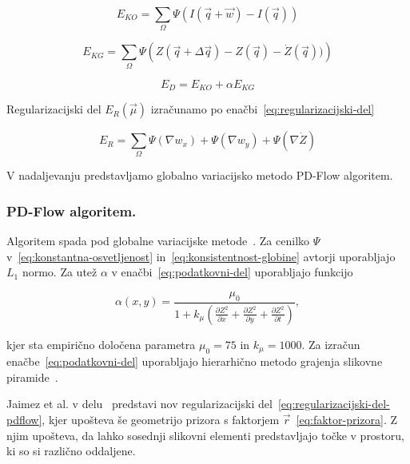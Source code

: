 \begin{equation}\label{eq:konstantna-osvetljenost}
	E_{KO} = \sum_\Omega \Psi( I(\vec{q} + \vec{w}) - I(\vec{q}))
\end{equation}

\begin{equation}\label{eq:konsistentnost-globine}
	E_{KG} = \sum_\Omega \Psi\left( Z(\vec{q} + \Delta \vec{q}) - Z(\vec{q}) - \dot{Z}(\vec{q}))\right)
\end{equation}

\begin{equation}\label{eq:podatkovni-del}
	E_D = E_{KO} + \alpha E_{KG}
\end{equation}

Regularizacijski del $E_R(\vec{\mu})$ izračunamo po enačbi~\eqref{eq:regularizacijski-del}

\begin{equation}\label{eq:regularizacijski-del}
	E_R = \sum_\Omega \Psi\left( \nabla w_x \right) + \Psi\left( \nabla w_y \right) + \Psi\left( \nabla \dot{Z} \right)
\end{equation}

V nadaljevanju predstavljamo globalno variacijsko metodo PD-Flow algoritem.


\subsubsection{PD-Flow algoritem.}\label{sec:pd-flow}
Algoritem spada pod globalne variacijske metode~\cite{jaimez2015primal}. Za cenilko $\Psi$ v~\eqref{eq:konstantna-osvetljenost} in~\eqref{eq:konsistentnost-globine} avtorji uporabljajo $L_1$ normo. Za utež $\alpha$ v enačbi~\eqref{eq:podatkovni-del} uporabljajo funkcijo 

\begin{equation}\label{eq:utez}
 \alpha(x,y) = \frac{\mu_0}{1 + k_\mu \left( \frac{\partial Z^2}{\partial x} + \frac{\partial Z^2}{\partial y} + \frac{\partial Z^2}{\partial t} \right)},
\end{equation}

kjer sta empirično določena parametra $\mu_0 = 75$ in $k_\mu = 1000$. Za izračun enačbe~\eqref{eq:podatkovni-del} uporabljajo hierarhično metodo grajenja slikovne piramide~\cite{jaimez2015primal}.

Jaimez et al. v delu~\cite{jaimez2015primal} predstavi nov regularizacijski del~\eqref{eq:regularizacijski-del-pdflow}, kjer upošteva še geometrijo prizora s faktorjem $\vec{r}$~\eqref{eq:faktor-prizora}. Z njim upošteva, da lahko sosednji slikovni elementi predstavljajo točke v prostoru, ki so si različno oddaljene.

